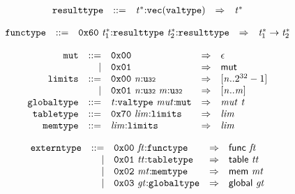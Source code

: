 $$
\begin{array}{@{}l@{}rrlll@{}l@{}}
& {\mathtt{resulttype}} &::=& {{\mathit{t}}^\ast}{:}{\mathtt{vec}}({\mathtt{valtype}}) &\Rightarrow& {{\mathit{t}}^\ast} \\
\end{array}
$$

\vspace{1ex}

$$
\begin{array}{@{}l@{}rrlll@{}l@{}}
& {\mathtt{functype}} &::=& \mathtt{0x60}~{{\mathit{t}}_{{1}}^\ast}{:}{\mathtt{resulttype}}~{{\mathit{t}}_{{2}}^\ast}{:}{\mathtt{resulttype}} &\Rightarrow& {{\mathit{t}}_{{1}}^\ast} \rightarrow {{\mathit{t}}_{{2}}^\ast} \\
\end{array}
$$

\vspace{1ex}

$$
\begin{array}{@{}l@{}rrlll@{}l@{}}
& {\mathtt{mut}} &::=& \mathtt{0x00} &\Rightarrow& \epsilon \\ &&|&
\mathtt{0x01} &\Rightarrow& \mathsf{mut} \\
& {\mathtt{limits}} &::=& \mathtt{0x00}~{\mathit{n}}{:}{\mathtt{u{\scriptstyle32}}} &\Rightarrow& {}[{\mathit{n}} .. {2^{32}} - 1] \\ &&|&
\mathtt{0x01}~{\mathit{n}}{:}{\mathtt{u{\scriptstyle32}}}~{\mathit{m}}{:}{\mathtt{u{\scriptstyle32}}} &\Rightarrow& {}[{\mathit{n}} .. {\mathit{m}}] \\
& {\mathtt{globaltype}} &::=& {\mathit{t}}{:}{\mathtt{valtype}}~{\mathit{mut}}{:}{\mathtt{mut}} &\Rightarrow& {\mathit{mut}}~{\mathit{t}} \\
& {\mathtt{tabletype}} &::=& \mathtt{0x70}~{\mathit{lim}}{:}{\mathtt{limits}} &\Rightarrow& {\mathit{lim}} \\
& {\mathtt{memtype}} &::=& {\mathit{lim}}{:}{\mathtt{limits}} &\Rightarrow& {\mathit{lim}} \\
\end{array}
$$

\vspace{1ex}

$$
\begin{array}{@{}l@{}rrlll@{}l@{}}
& {\mathtt{externtype}} &::=& \mathtt{0x00}~{\mathit{ft}}{:}{\mathtt{functype}} &\Rightarrow& \mathsf{func}~{\mathit{ft}} \\ &&|&
\mathtt{0x01}~{\mathit{tt}}{:}{\mathtt{tabletype}} &\Rightarrow& \mathsf{table}~{\mathit{tt}} \\ &&|&
\mathtt{0x02}~{\mathit{mt}}{:}{\mathtt{memtype}} &\Rightarrow& \mathsf{mem}~{\mathit{mt}} \\ &&|&
\mathtt{0x03}~{\mathit{gt}}{:}{\mathtt{globaltype}} &\Rightarrow& \mathsf{global}~{\mathit{gt}} \\
\end{array}
$$

